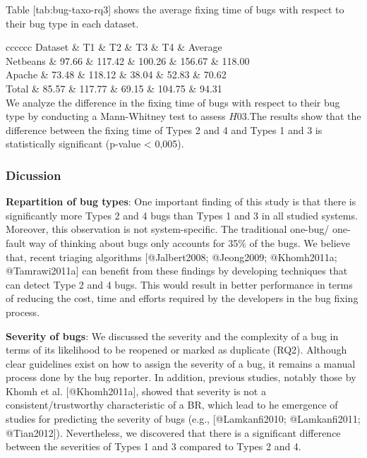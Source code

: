 Table {[}tab:bug-taxo-rq3{]} shows the average fixing time of bugs with
respect to their bug type in each dataset.

{c\textbar{}c\textbar{}c\textbar{}c\textbar{}c\textbar{}c} Dataset \& T1
\& T2 \& T3 \& T4 \& Average\\
Netbeans \& 97.66 \& 117.42 \& 100.26 \& 156.67 \& 118.00\\
Apache \& 73.48 \& 118.12 \& 38.04 \& 52.83 \& 70.62\\
Total \& 85.57 \& 117.77 \& 69.15 \& 104.75 \& 94.31\\
We analyze the difference in the fixing time of bugs with respect to
their bug type by conducting a Mann-Whitney test to assess \(H03\).The
results show that the difference between the fixing time of Types 2 and
4 and Types 1 and 3 is statistically significant (p-value \textless{}
0,005).

\subsubsection{Dicussion}\label{dicussion}

{\textbf{Repartition of bug types}}: One important finding of this study
is that there is significantly more Types 2 and 4 bugs than Types 1 and
3 in all studied systems. Moreover, this observation is not
system-specific. The traditional one-bug/ one-fault way of thinking
about bugs only accounts for 35\% of the bugs. We believe that, recent
triaging algorithms {[}@Jalbert2008; @Jeong2009; @Khomh2011a;
@Tamrawi2011a{]} can benefit from these findings by developing
techniques that can detect Type 2 and 4 bugs. This would result in
better performance in terms of reducing the cost, time and efforts
required by the developers in the bug fixing process.

{\textbf{Severity of bugs}}: We discussed the severity and the
complexity of a bug in terms of its likelihood to be reopened or marked
as duplicate (RQ2). Although clear guidelines exist on how to assign the
severity of a bug, it remains a manual process done by the bug reporter.
In addition, previous studies, notably those by Khomh et al.
{[}@Khomh2011a{]}, showed that severity is not a consistent/trustworthy
characteristic of a BR, which lead to he emergence of studies for
predicting the severity of bugs (e.g., {[}@Lamkanfi2010; @Lamkanfi2011;
@Tian2012{]}). Nevertheless, we discovered that there is a significant
difference between the severities of Types 1 and 3 compared to Types 2
and 4.


